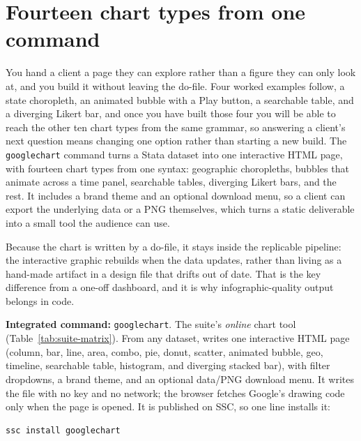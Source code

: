 \documentclass[
    a4paper,
    fontsize=10pt,
    twoside=true,
    numbers=noenddot,
]{kaobook}
\begin{document}
\section{Fourteen chart types from one command}
You hand a client a page they can explore rather than a figure they can only look at, and you build it without leaving the do-file. Four worked examples follow, a state choropleth, an animated bubble with a Play button, a searchable table, and a diverging Likert bar, and once you have built those four you will be able to reach the other ten chart types from the same grammar, so answering a client's next question means changing one option rather than starting a new build. The \texttt{googlechart} command turns a Stata dataset into one interactive HTML page, with fourteen chart types from one syntax: geographic choropleths, bubbles that animate across a time panel, searchable tables, diverging Likert bars, and the rest. It includes a brand theme and an optional download menu, so a client can export the underlying data or a PNG themselves, which turns a static deliverable into a small tool the audience can use.

Because the chart is written by a do-file, it stays inside the replicable pipeline: the interactive graphic rebuilds when the data updates, rather than living as a hand-made artifact in a design file that drifts out of date. That is the key difference from a one-off dashboard, and it is why infographic-quality output belongs in code.

\begin{kaobox}[frametitle=Package Integration: \texttt{googlechart}]
\textbf{Integrated command:} \texttt{googlechart}. The suite's \emph{online} chart tool (Table~\ref{tab:suite-matrix}). From any dataset, writes one interactive HTML page (column, bar, line, area, combo, pie, donut, scatter, animated bubble, geo, timeline, searchable table, histogram, and diverging stacked bar), with filter dropdowns, a brand theme, and an optional data/PNG download menu. It writes the file with no key and no network; the browser fetches Google's drawing code only when the page is opened. It is published on SSC, so one line installs it:
\par
{\footnotesize
\begin{verbatim}
ssc install googlechart
\end{verbatim}
}
\end{kaobox}
\end{document}
